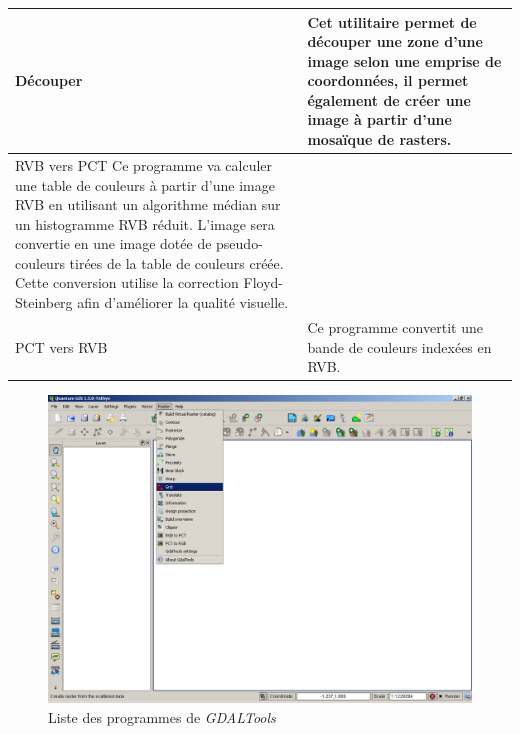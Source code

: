 {\begin{longtable}{|p{3cm}|p{13cm}|}
\hline Découper & Cet utilitaire permet de découper une zone d'une image selon une emprise de coordonnées, il permet également de créer une image à partir d'une mosaïque de rasters. \\
\hline RVB vers PCT Ce programme va calculer une table de couleurs à partir d'une image RVB en utilisant un algorithme médian sur un histogramme RVB réduit. L'image sera convertie en une image dotée de pseudo-couleurs tirées de la table de couleurs créée. Cette conversion utilise la correction Floyd-Steinberg afin d'améliorer la qualité visuelle. \\
PCT vers RVB & Ce programme convertit une bande de couleurs indexées en RVB.\\
\end{longtable}

\begin{figure}[ht]
   \centering
   \caption{Liste des programmes de \emph{GDALTools} \nixcaption}\label{gdaltools_menu}
   \includegraphics[clip=true, width=12cm]{plugins_gdaltools_images/raster_menu}
\end{figure}

}

